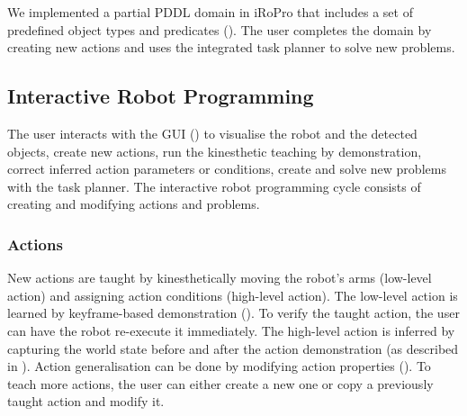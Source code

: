 We implemented a partial PDDL domain in iRoPro that includes a set of predefined object types and predicates ().
The user completes the domain by creating new actions and uses the integrated task planner to solve new problems.


\subsection{Interactive Robot Programming}
\label{sec:interactive}
The user interacts with the GUI () to visualise the robot and the detected objects, create new actions, run the kinesthetic teaching by demonstration, correct inferred action parameters or conditions, create and solve new problems with the task planner.
The interactive robot programming cycle consists of creating and modifying actions and problems.
\subsubsection{Actions} New actions are taught by kinesthetically moving the robot's arms (low-level action) and assigning action conditions (high-level action).
The low-level action is learned %
by keyframe-based demonstration ().
To verify the taught action, the user can have the robot re-execute it immediately.
The high-level action is inferred by capturing the world state before and after the action demonstration (as described in ).
Action generalisation can be done by modifying action properties ().
To teach more actions, the user can either create a new one or copy a previously taught action and modify it.
